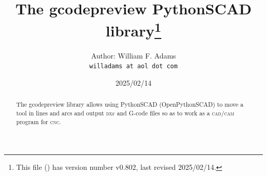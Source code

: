 \documentclass{ltxdoc}
\begin{document}
%
%



\def\fileversion{v0.802} \def\filedate{2025/02/14}









\title{The gcodepreview PythonSCAD library\thanks{This
        file (\texttt{\jobname}) has version number \fileversion, last revised
        \filedate.}}

\author{%
Author: William F. Adams\\
\texttt{willadams at aol dot com}
}
\date{\filedate}
\maketitle
\begin{abstract}
\noindent The gcodepreview library allows using PythonSCAD (OpenPythonSCAD) to move a tool in lines and arcs and output \textsc{dxf} and G-code files so as to work as a \textsc{cad}/\allowbreak \textsc{cam} program for \textsc{cnc}.
\end{abstract}
\enlargethispage{\baselineskip}
\tableofcontents
\end{document}
